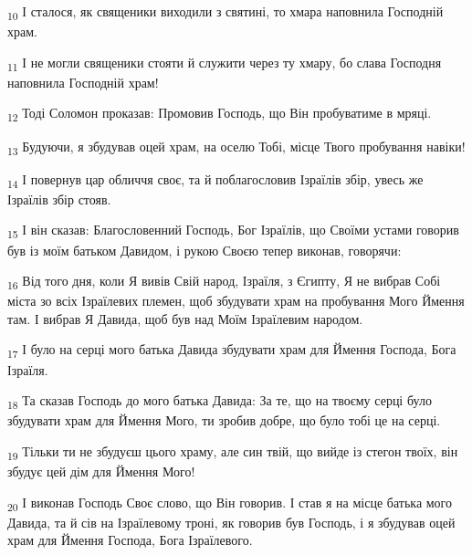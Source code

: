 \begin{tcolorbox}
\textsubscript{10} І сталося, як священики виходили з святині, то хмара наповнила Господній храм.
\end{tcolorbox}
\begin{tcolorbox}
\textsubscript{11} І не могли священики стояти й служити через ту хмару, бо слава Господня наповнила Господній храм!
\end{tcolorbox}
\begin{tcolorbox}
\textsubscript{12} Тоді Соломон проказав: Промовив Господь, що Він пробуватиме в мряці.
\end{tcolorbox}
\begin{tcolorbox}
\textsubscript{13} Будуючи, я збудував оцей храм, на оселю Тобі, місце Твого пробування навіки!
\end{tcolorbox}
\begin{tcolorbox}
\textsubscript{14} І повернув цар обличчя своє, та й поблагословив Ізраїлів збір, увесь же Ізраїлів збір стояв.
\end{tcolorbox}
\begin{tcolorbox}
\textsubscript{15} І він сказав: Благословенний Господь, Бог Ізраїлів, що Своїми устами говорив був із моїм батьком Давидом, і рукою Своєю тепер виконав, говорячи:
\end{tcolorbox}
\begin{tcolorbox}
\textsubscript{16} Від того дня, коли Я вивів Свій народ, Ізраїля, з Єгипту, Я не вибрав Собі міста зо всіх Ізраїлевих племен, щоб збудувати храм на пробування Мого Ймення там. І вибрав Я Давида, щоб був над Моїм Ізраїлевим народом.
\end{tcolorbox}
\begin{tcolorbox}
\textsubscript{17} І було на серці мого батька Давида збудувати храм для Ймення Господа, Бога Ізраїля.
\end{tcolorbox}
\begin{tcolorbox}
\textsubscript{18} Та сказав Господь до мого батька Давида: За те, що на твоєму серці було збудувати храм для Ймення Мого, ти зробив добре, що було тобі це на серці.
\end{tcolorbox}
\begin{tcolorbox}
\textsubscript{19} Тільки ти не збудуєш цього храму, але син твій, що вийде із стегон твоїх, він збудує цей дім для Ймення Мого!
\end{tcolorbox}
\begin{tcolorbox}
\textsubscript{20} І виконав Господь Своє слово, що Він говорив. І став я на місце батька мого Давида, та й сів на Ізраїлевому троні, як говорив був Господь, і я збудував оцей храм для Ймення Господа, Бога Ізраїлевого.
\end{tcolorbox}
